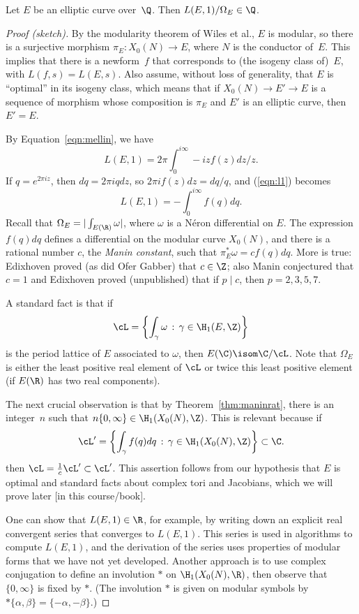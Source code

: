 \documentclass{report}
\begin{document}
\begin{theorem}
Let $E$ be an elliptic curve over~$\Q$.  Then $L(E,1)/\Omega_E\in\Q$.
\end{theorem}
\begin{proof}[Proof (sketch)]
By the modularity theorem of Wiles et al., $E$ is modular, so
there is a surjective morphism $\pi_E : X_0(N)\to E$, where $N$ is
the conductor of~$E$.  This implies that there is a newform~$f$
that corresponds to (the isogeny class of)~$E$, with
$L(f,s)=L(E,s)$.   Also assume, without loss of generality, that
$E$ is ``optimal'' in its isogeny class, which means that if
$X_0(N)\to E'\to E$ is a sequence of morphism whose composition is
$\pi_E$ and $E'$ is an elliptic curve, then $E'=E$.

By Equation~\ref{eqn:mellin}, we have
\begin{equation}\label{eqn:l1}
  L(E,1) = 2\pi\int_{0}^{i\infty} -iz f(z) dz/z.
\end{equation}
If $q=e^{2\pi i z}$, then $dq=2\pi i q dz$, so $2\pi i f(z) dz =
dq/q$, and (\ref{eqn:l1}) becomes
\[
  L(E,1) = -\int_{0}^{i\infty} f(q) dq.
\]
Recall that $\Omega_E = |\int_{E(\R)} \omega|$, where $\omega$ is a
N\'eron differential on $E$.  The expression $f(q) dq$ defines a
differential on the modular curve $X_0(N)$, and there is a rational
number $c$, the {\em Manin constant}, such that $\pi_E^*\omega = c
f(q) dq$.  More is true: Edixhoven proved (as did Ofer Gabber) that
$c\in\Z$; also Manin conjectured that $c=1$ and Edixhoven proved
(unpublished) that if $p\mid c$, then $p=2,3,5,7$.

A standard fact is that if
\[
 \cL = \left\{ \int_{\gamma} \omega \,:\, \gamma\in\H_1(E,\Z) \right\}
\]
is the period lattice of $E$ associated to $\omega$,
then $E(\C)\isom \C/\cL$.  Note that $\Omega_E$ is either
the least positive real element of $\cL$ or twice this
least positive element (if $E(\R)$ has two real components).

The next crucial observation is that by Theorem~\ref{thm:maninrat},
there is an integer~$n$ such that $n\{0,\infty\}\in\H_1(X_0(N),\Z)$.
This is relevant because if
\[
   \cL' = \left\{ \int_{\gamma} f(q)dq \,:\, \gamma\in\H_1(X_0(N),\Z)\right\} \subset \C.
\]
then $\cL=\frac{1}{c}\cL'\subset \cL'$.  This assertion follows from
our hypothesis that $E$ is optimal and standard facts about complex
tori and Jacobians, which we will prove later [in this course/book].

One can show that $L(E,1)\in\R$, for example, by writing down an explicit
real convergent series that converges to $L(E,1)$.  This series is used
in algorithms to compute $L(E,1)$, and the derivation of the series uses
properties of modular forms that we have not yet developed.  Another approach
is to use complex conjugation to define an involution $*$ on
$\H_1(X_0(N),\R)$, then observe that $\{0,\infty\}$ is fixed by $*$.
(The involution $*$ is given on modular symbols by
$*\{\alpha,\beta\} = \{-\alpha,-\beta\}$.)


\end{proof}
\end{document}
